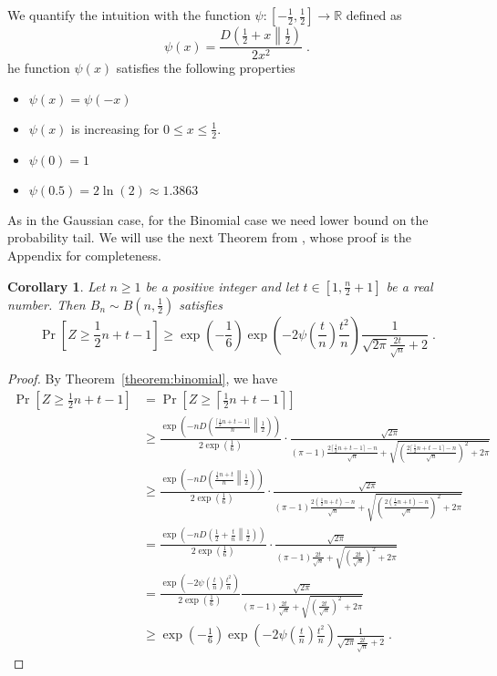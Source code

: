 \documentclass{article}
\newcommand{\field}[1]{\mathbb{#1}}
\newcommand{\R}{\field{R}}
\newtheorem{corollary}[theorem]{Corollary}
\begin{document}
We quantify the intuition with the function $\psi:[-\frac{1}{2},\frac{1}{2}] \to \R$
defined as
$$
\psi(x) = \frac{D \left(\frac{1}{2}+x \middle\| \frac{1}{2} \right)}{2 x^2} \; .
$$
he function $\psi(x)$ satisfies the following properties
\begin{itemize}
\item $\psi(x) = \psi(-x)$
\item $\psi(x)$ is increasing for $0\le x \le \frac{1}{2}$.
\item $\psi(0) = 1$
\item $\psi(0.5) = 2 \ln(2) \approx 1.3863$
\end{itemize}

As in the Gaussian case, for the Binomial case we need lower bound on the
probability tail.  We will use the next Theorem from \cite{nOrabona13}, whose
proof is the Appendix for completeness.

\begin{corollary}
Let $n \ge 1$ be a positive integer and let $t \in [1, \frac{n}{2} + 1]$ be a real number. Then $B_n \sim B(n, \frac{1}{2})$ satisfies
$$
\Pr \left[ Z \ge \frac{1}{2} n + t - 1 \right] \ge \exp\left(-\frac{1}{6}\right) \exp\left(- 2 \psi\left(\frac{t}{n}\right) \frac{t^2}{n} \right) \frac{1}{\sqrt{2\pi} \frac{2 t}{\sqrt{n}} + 2} \; .
$$
\end{corollary}

\begin{proof}
By Theorem~\ref{theorem:binomial}, we have
\begin{align*}
\Pr \left[ Z \ge  \frac{1}{2} n + t - 1 \right]
& = \Pr \left[ Z \ge \left\lceil \frac{1}{2} n + t - 1 \right\rceil \right] \\
& \ge \frac{\exp\left(-n D \left(\frac{\lceil \frac{1}{2}n + t - 1 \rceil}{n} \middle\| \frac{1}{2} \right)\right)}{2 \exp\left(\frac{1}{6}\right)} \cdot \frac{\sqrt{2\pi}}{(\pi-1) \frac{2\lceil \frac{1}{2}n + t - 1 \rceil - n}{\sqrt{n}} + \sqrt{ \left(\frac{2\lceil \frac{1}{2}n + t - 1 \rceil - n}{\sqrt{n}} \right)^2 + 2 \pi}} \\
& \ge \frac{\exp\left(-n D \left(\frac{\frac{1}{2}n + t}{n} \middle\| \frac{1}{2} \right)\right)}{2 \exp\left(\frac{1}{6}\right)} \cdot \frac{\sqrt{2\pi}}{(\pi-1) \frac{2 (\frac{1}{2}n + t) - n}{\sqrt{n}} + \sqrt{ \left(\frac{2 (\frac{1}{2}n + t) - n}{\sqrt{n}} \right)^2 + 2 \pi}} \\
& = \frac{\exp\left(-n D \left(\frac{1}{2} + \frac{t}{n} \middle\| \frac{1}{2} \right)\right)}{2 \exp\left(\frac{1}{6}\right)} \cdot \frac{\sqrt{2\pi}}{(\pi-1) \frac{2t}{\sqrt{n}} + \sqrt{ \left(\frac{2t}{\sqrt{n}} \right)^2 + 2 \pi}} \\
& =  \frac{\exp\left(- 2 \psi(\frac{t}{n}) \frac{t^2}{n} \right)}{2 \exp\left(\frac{1}{6}\right)} \frac{\sqrt{2\pi}}{(\pi-1)\frac{2t}{\sqrt{n}}+\sqrt{\left(\frac{2t}{\sqrt{n}}\right)^2+2 \pi}} \\
& \ge \exp\left(-\frac{1}{6}\right) \exp\left(- 2 \psi\left(\frac{t}{n}\right) \frac{t^2}{n} \right) \frac{1}{\sqrt{2\pi} \frac{2 t}{\sqrt{n}} + 2} \; .
\end{align*}
\end{proof}
\end{document}

